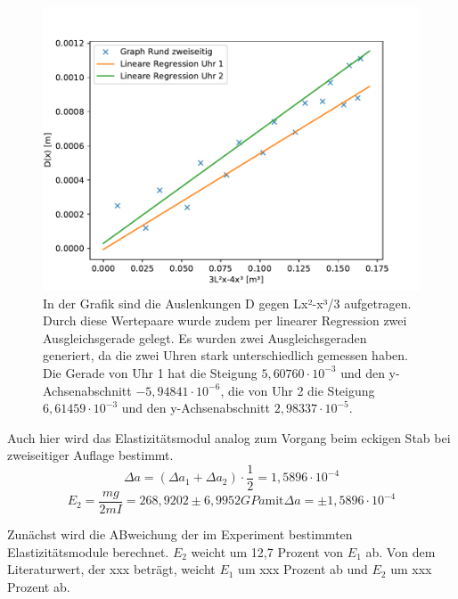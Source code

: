 \documentclass[titlepage = firstcover]{scrartcl}
\begin{document}
      \begin{figure}[h]
        \centering
        \includegraphics[width=0.7\linewidth]{rzwei.pdf}
        \caption{In der Grafik sind die Auslenkungen D gegen Lx²-x³/3 aufgetragen. Durch diese Wertepaare wurde zudem per linearer Regression zwei Ausgleichsgerade gelegt. Es wurden zwei Ausgleichsgeraden generiert, da die zwei Uhren stark unterschiedlich gemessen haben. Die Gerade von Uhr 1 hat die Steigung $5,60760\cdot10^{-3}$ und den y-Achsenabschnitt $-5,94841\cdot10^{-6}$, die von Uhr 2 die Steigung $6,61459\cdot10^{-3}$ und den y-Achsenabschnitt $2,98337\cdot10^{-5}$.}
        \label{fig:graphRzwei}
      \end{figure}
      Auch hier wird das Elastizitätsmodul analog zum Vorgang beim eckigen Stab bei zweiseitiger Auflage bestimmt.
      \begin{equation*}
        \Delta a = (\Delta a_1 + \Delta a_2) \cdot \frac{1}{2} = 1,5896 \cdot 10^{-4}
      \end{equation*}
      \begin{equation*}
        E_2 = \frac{mg}{2mI} = 268,9202 \pm 6,9952 GPa \text{mit} \Delta a = \pm 1,5896 \cdot 10^{-4}
      \end{equation*}

      Zunächst wird die ABweichung der im Experiment bestimmten Elastizitätsmodule berechnet. $E_2$ weicht um 12,7 Prozent von $E_1$ ab.
      Von dem Literaturwert, der xxx beträgt, weicht $E_1$ um xxx Prozent ab und $E_2$ um xxx Prozent ab.
\end{document}
